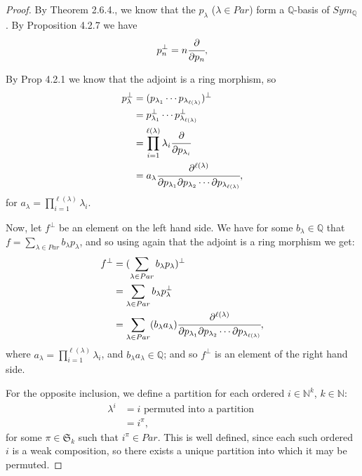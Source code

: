 \documentclass[8pt]{extarticle}
\newcommand{\N}{\mathbb{N}}
\newcommand{\Q}{\mathbb{Q}}
\newcommand{\<}{\langle}
\renewcommand{\>}{\rangle}
\theoremstyle{definition}
\begin{document}
\begin{proof}
  By Theorem 2.6.4., we know that the $p_\lambda$ ($\lambda \in Par$) form a $\Q$-basis of $Sym_\Q$. By Proposition 4.2.7 we have
  \begin{align*}
    p_n^{\perp} = n \cfrac{\partial}{\partial p_n},
  \end{align*}

  By Prop 4.2.1 we know that the adjoint is a ring morphism, so
  \begin{align*}
    p_{\lambda}^{\perp} &=
    (p_{\lambda_1} \cdots p_{\lambda_{\ell(\lambda)}})^{\perp} \\
    &= p_{\lambda_1}^{\perp} \cdots p_{\lambda_{\ell(\lambda)}}^{\perp} \\
    &= \prod_{i=1}^{\ell(\lambda)} \lambda_i \cfrac{\partial}{\partial p_{\lambda_i}} \\
    &= a_{\lambda} \cfrac{\partial^{\ell(\lambda)}}{\partial p_{\lambda_1}\partial p_{\lambda_2} \cdots \partial p_{\lambda_{\ell(\lambda)}}},
  \end{align*}
  for $a_{\lambda} = \prod\limits_{i=1}^{\ell(\lambda)} \lambda_i$.

  Now, let $f^{\perp}$ be an element on the left hand side. We have for some $b_\lambda \in \Q$ that $f = \sum\limits_{\lambda \in Par} b_{\lambda} p_{\lambda}$, and so using again that the adjoint is a ring morphism we get:
  \begin{align*}
    f^{\perp}
    &=
    (\sum\limits_{\lambda \in Par} b_{\lambda} p_{\lambda})^{\perp}
    \\
    &=
    \sum\limits_{\lambda \in Par} b_{\lambda} p_{\lambda}^{\perp}    \\
    &=
    \sum\limits_{\lambda \in Par} (b_{\lambda} a_{\lambda}) \cfrac{\partial^{\ell(\lambda)}}{\partial p_{\lambda_1}\partial p_{\lambda_2} \cdots \partial p_{\lambda_{\ell(\lambda)}}}, 
  \end{align*}
  where $a_{\lambda} = \prod\limits_{i=1}^{\ell(\lambda)} \lambda_i$, and $b_{\lambda} a_{\lambda} \in \Q$; and so $f^{\perp}$ is an element of the right hand side.

  For the opposite inclusion, we define a partition for each ordered $i \in \N^k$, $k \in \N$:
  \begin{align*}
    \lambda^i
    &= i \text{ permuted into a partition } \\
    &= i^{\pi},
  \end{align*}
  for some $\pi \in \mathfrak{S}_k$ such that $i^{\pi} \in Par$. This is well defined, since each such ordered $i$ is a weak composition, so there exists a unique partition into which it may be permuted.


\end{proof}
\end{document}
